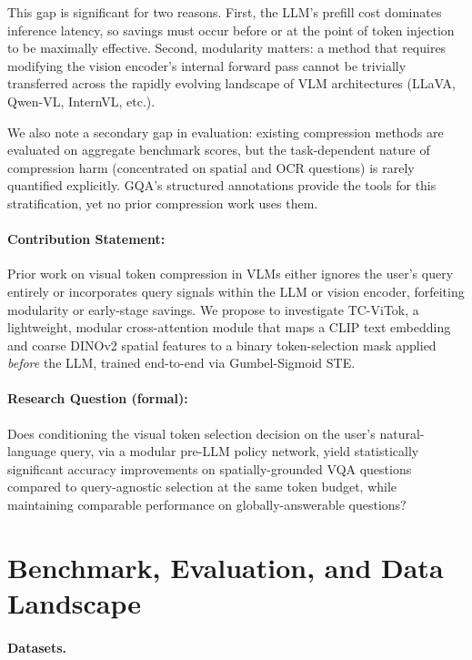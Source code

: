 \documentclass[11pt,twocolumn]{article}
\begin{document}
This gap is significant for two reasons. First, the LLM's prefill cost dominates inference latency, so savings must occur before or at the point of token injection to be maximally effective. Second, modularity matters: a method that requires modifying the vision encoder's internal forward pass cannot be trivially transferred across the rapidly evolving landscape of VLM architectures (LLaVA, Qwen-VL, InternVL, etc.).

We also note a secondary gap in evaluation: existing compression methods are evaluated on aggregate benchmark scores, but the task-dependent nature of compression harm (concentrated on spatial and OCR questions) is rarely quantified explicitly. GQA's structured annotations provide the tools for this stratification, yet no prior compression work uses them.

\paragraph{Contribution Statement:}
Prior work on visual token compression in VLMs either ignores the user's query entirely or incorporates query signals within the LLM or vision encoder, forfeiting modularity or early-stage savings. We propose to investigate TC-ViTok, a lightweight, modular cross-attention module that maps a CLIP text embedding and coarse DINOv2 spatial features to a binary token-selection mask applied \emph{before} the LLM, trained end-to-end via Gumbel-Sigmoid STE.

\paragraph{Research Question (formal):}
Does conditioning the visual token selection decision on the user's natural-language query, via a modular pre-LLM policy network, yield statistically significant accuracy improvements on spatially-grounded VQA questions compared to query-agnostic selection at the same token budget, while maintaining comparable performance on globally-answerable questions?

\section{Benchmark, Evaluation, and Data Landscape}
\label{sec:benchmarks}

\paragraph{Datasets.}
\end{document}
